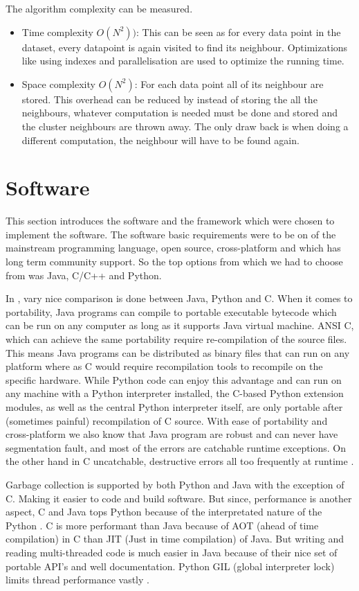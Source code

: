 The algorithm complexity can be measured. 
\begin{itemize}
	\item Time complexity \(O(N^2))\): This can be seen as for every data point in the dataset, every datapoint is again visited to find its neighbour. Optimizations like using indexes and parallelisation are used to optimize the running time.
	\item Space complexity \(O(N^2)\): For each data point all of its neighbour are stored. This overhead can be reduced by instead of storing the all the neighbours, whatever computation is needed must be done and stored and the cluster neighbours are thrown away. The only draw back is when doing a different computation, the neighbour will have to be found again. 
\end{itemize}

\section{Software}

This section introduces the software and the framework which were chosen to implement the software. The software basic requirements were to be on of the mainstream programming language, open source, cross-platform and which has long term community support. So the top options from which we had to choose from was Java, C/C++ and Python.

In \cite{hugunin1997Python}, vary nice comparison is done between Java, Python and C. When it comes to portability, Java programs can compile to portable executable bytecode which can be run on any computer as long as it supports Java virtual machine. ANSI C, which can achieve the same portability require re-compilation of the source files. This means Java programs can be distributed as binary files that can run on any platform where as C would require recompilation tools to recompile on the specific hardware. While Python code can enjoy this advantage and can run on any machine with a Python interpreter installed, the C-based Python extension modules, as well as the central Python interpreter itself, are only portable after (sometimes painful) recompilation of C source. With ease of portability and cross-platform we also know that Java program are robust and can never have segmentation fault, and most of the errors are catchable runtime exceptions. On the other hand in C uncatchable, destructive errors all too frequently at runtime \cite{hugunin1997Python}.

Garbage collection is supported by both Python and Java with the exception of C. Making it easier to code and build software. But since, performance is another aspect, C and Java tops Python because of the interpretated nature of the Python \cite{hugunin1997Python}. C is more performant than Java because of AOT (ahead of time compilation) in C than JIT (Just in time compilation) of Java. But writing and reading multi-threaded code is much easier in Java because of their nice set of portable API's and well documentation. Python GIL (global interpreter lock) limits thread performance vastly \cite{beazley2010understanding}.

